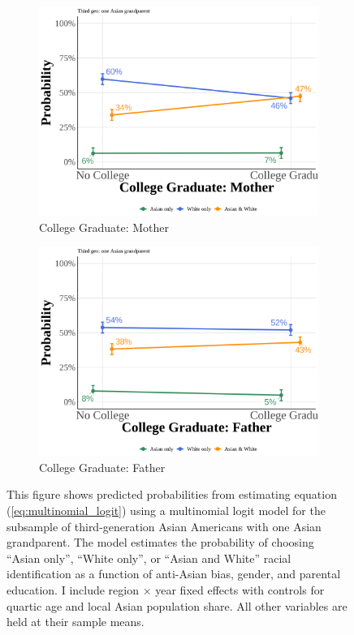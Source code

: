 \begin{center}
\begin{figure}[!htb]
\vspace{0.5cm}

\begin{subfigure}{.48\textwidth}
\caption{College Graduate: Mother}
\centering
\includegraphics[width=1\linewidth]{simple_pp_MomGradCollege_third_one.png}
\end{subfigure}
\hfill
\begin{subfigure}{.48\textwidth}
\caption{College Graduate: Father}
\centering
\includegraphics[width=1\linewidth]{simple_pp_DadGradCollege_third_one.png}
\end{subfigure}

\caption*{\footnotesize{This figure shows predicted probabilities from estimating equation (\ref{eq:multinomial_logit}) using a multinomial logit model for the subsample of third-generation Asian Americans with one Asian grandparent. The model estimates the probability of choosing ``Asian only'', ``White only'', or ``Asian and White'' racial identification as a function of anti-Asian bias, gender, and parental education. I include region $\times$ year fixed effects with controls for quartic age and local Asian population share. All other variables are held at their sample means.}}
\end{figure}
\end{center}

